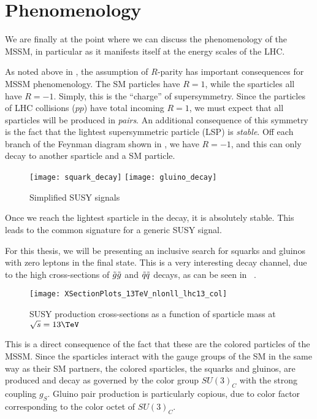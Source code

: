 \section{Phenomenology}

We are finally at the point where we can discuss the phenomenology of the MSSM, in particular as it manifests itself at the energy scales of the LHC.

As noted above in , the assumption of $R$-parity has important consequences for MSSM phenomenology.
The SM particles have $R=1$, while the sparticles all have $R=-1$.
Simply, this is the ``charge'' of supersymmetry.
Since the particles of LHC collisions ($pp$) have total incoming $R=1$, we must expect that all sparticles will be produced in \textit{pairs}.
An additional consequence of this symmetry is the fact that the lightest supersymmetric particle (LSP)  is \textit{stable}.
Off each branch of the Feynman diagram shown in , we have $R=-1$, and this can only decay to another sparticle and a SM particle.
\begin{figure}
\caption{Simplified SUSY signals}\label{fig:signal_feynman}
\texttt{[image: squark\_decay]}
\texttt{[image: gluino\_decay]}
\end{figure}
Once we reach the lightest sparticle in the decay, it is absolutely stable.
This leads to the common signature \met for a generic SUSY signal.

For this thesis, we will be presenting an inclusive search for squarks and gluinos with zero leptons in the final state.
This is a very interesting decay channel, due to the high cross-sections of $\tilde{g} \tilde{g}$ and $\tilde{q} \tilde{q}$ decays, as can be seen in  ~\cite{Borschensky:2014cia}.

\begin{figure}\label{fig:susy_xsec}
\caption{SUSY production cross-sections as a function of sparticle mass at $\sqrt{s} = 13 \TeV$}
\texttt{[image: XSectionPlots\_13TeV\_nlonll\_lhc13\_col]}
\end{figure}
This is a direct consequence of the fact that these are the colored particles of the MSSM.
Since the sparticles interact with the gauge groups of the SM in the same way as their SM partners, the colored sparticles, the squarks and gluinos, are produced and decay as governed by the color group $SU(3)_C$ with the strong coupling $g_S$.
Gluino pair production is particularly copious, due to color factor corresponding to the color octet of $SU(3)_C$.

